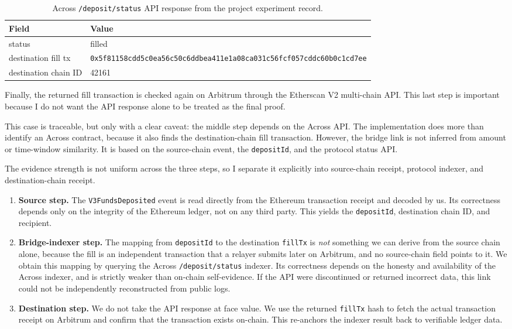 \documentclass[12pt,a4paper]{article}
\begin{document}
\begin{table}[htbp]
\centering
\caption{Across \texttt{/deposit/status} API response from the project experiment record.}
\label{tab:across_status}
\small
\begin{tabularx}{\textwidth}{l Y}
\toprule
\textbf{Field} & \textbf{Value} \\
\midrule
status & filled \\
destination fill tx & \texttt{0x5f81158cdd5c0ea56c50c6ddbea411e1a08ca031c56fcf057cddc60b0c1cd7ee} \\
destination chain ID & 42161 \\
\bottomrule
\end{tabularx}
\end{table}

Finally, the returned fill transaction is checked again on Arbitrum through the Etherscan V2 multi-chain API. This last step is important because I do not want the API response alone to be treated as the final proof.

This case is traceable, but only with a clear caveat: the middle step depends on the Across API. The implementation does more than identify an Across contract, because it also finds the destination-chain fill transaction. However, the bridge link is not inferred from amount or time-window similarity. It is based on the source-chain event, the \texttt{depositId}, and the protocol status API.

The evidence strength is not uniform across the three steps, so I separate it explicitly into source-chain receipt, protocol indexer, and destination-chain receipt.

\begin{enumerate}
    \item \textbf{Source step.} The \texttt{V3FundsDeposited} event is read directly from the Ethereum transaction receipt and decoded by us. Its correctness depends only on the integrity of the Ethereum ledger, not on any third party. This yields the \texttt{depositId}, destination chain ID, and recipient.
    \item \textbf{Bridge-indexer step.} The mapping from \texttt{depositId} to the destination \texttt{fillTx} is \emph{not} something we can derive from the source chain alone, because the fill is an independent transaction that a relayer submits later on Arbitrum, and no source-chain field points to it. We obtain this mapping by querying the Across \texttt{/deposit/status} indexer. Its correctness depends on the honesty and availability of the Across indexer, and is strictly weaker than on-chain self-evidence. If the API were discontinued or returned incorrect data, this link could not be independently reconstructed from public logs.
    \item \textbf{Destination step.} We do not take the API response at face value. We use the returned \texttt{fillTx} hash to fetch the actual transaction receipt on Arbitrum and confirm that the transaction exists on-chain. This re-anchors the indexer result back to verifiable ledger data.
\end{enumerate}
\end{document}
